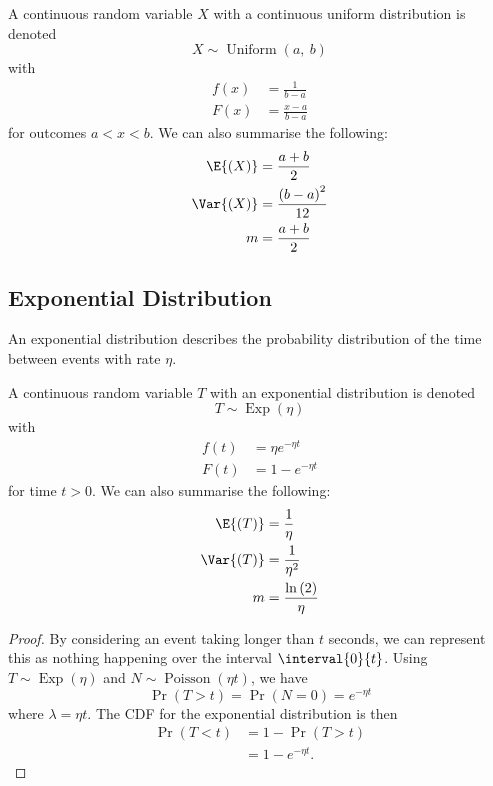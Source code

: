 \documentclass{article}
\begin{document}
A continuous random variable \(X\) with a continuous uniform distribution is denoted
\begin{equation*}
    X \sim \operatorname{Uniform}{\left( a,\: b \right)}
\end{equation*}
with
\begin{align*}
    f\left( x \right) & = \frac{1}{b - a}     \\
    F\left( x \right) & = \frac{x - a}{b - a}
\end{align*}
for outcomes \(a < x < b\).
We can also summarise the following:
\begin{align*}
    \E{\left( X \right)}   & = \frac{a + b}{2}                   \\
    \Var{\left( X \right)} & = \frac{\left( b - a \right)^2}{12} \\
    m                      & = \frac{a + b}{2}
\end{align*}
\subsection{Exponential Distribution}
An exponential distribution describes the probability distribution of the time between events with rate \(\eta\).

A continuous random variable \(T\) with an exponential distribution is denoted
\begin{equation*}
    T \sim \operatorname{Exp}{\left( \eta \right)}
\end{equation*}
with
\begin{align*}
    f\left( t \right) & = \eta e^{-\eta t} \\
    F\left( t \right) & = 1 - e^{-\eta t}
\end{align*}
for time \(t > 0\).
We can also summarise the following:
\begin{align*}
    \E{\left( T \right)}   & = \frac{1}{\eta}                     \\
    \Var{\left( T \right)} & = \frac{1}{\eta^2}                       \\
    m                      & = \frac{\ln{\left( 2 \right)}}{\eta}
\end{align*}
\begin{proof}
    By considering an event taking longer than \(t\) seconds, we can represent this as nothing happening
    over the interval \(\interval{0}{t}\). Using \(T \sim \operatorname{Exp}{\left( \eta \right)}\) and
    \(N \sim \operatorname{Poisson}{\left( \eta t \right)}\), we have
    \begin{equation*}
        \Pr{\left( T > t \right)} = \Pr{\left( N = 0 \right)} = e^{-\eta t}
    \end{equation*}
    where \(\lambda = \eta t\). The CDF for the exponential distribution is then
    \begin{align*}
        \Pr{\left( T < t \right)} & = 1 - \Pr{\left( T > t \right)} \\
                                  & = 1 - e^{-\eta t}.
    \end{align*}
\end{proof}
\end{document}
